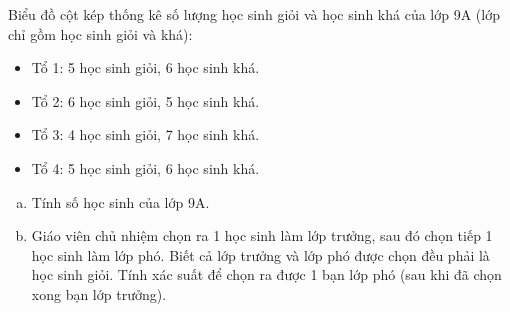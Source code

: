 \begin{bt}%
Biểu đồ cột kép thống kê số lượng học sinh giỏi và học sinh khá của lớp 9A (lớp chỉ gồm học sinh giỏi và khá):
\begin{itemize}
    \item Tổ 1: 5 học sinh giỏi, 6 học sinh khá.
    \item Tổ 2: 6 học sinh giỏi, 5 học sinh khá.
    \item Tổ 3: 4 học sinh giỏi, 7 học sinh khá.
    \item Tổ 4: 5 học sinh giỏi, 6 học sinh khá.
\end{itemize}
\begin{enumerate}[a)]
    \item Tính số học sinh của lớp 9A.
    \item Giáo viên chủ nhiệm chọn ra 1 học sinh làm lớp trưởng, sau đó chọn tiếp 1 học sinh làm lớp phó. Biết cả lớp trưởng và lớp phó được chọn đều phải là học sinh giỏi. Tính xác suất để chọn ra được 1 bạn lớp phó (sau khi đã chọn xong bạn lớp trưởng).
\end{enumerate}
\end{bt}

